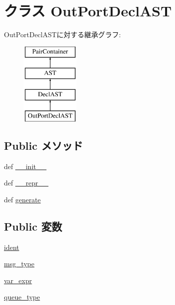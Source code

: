 \hypertarget{classslicc_1_1ast_1_1OutPortDeclAST_1_1OutPortDeclAST}{
\section{クラス OutPortDeclAST}
\label{classslicc_1_1ast_1_1OutPortDeclAST_1_1OutPortDeclAST}
}
OutPortDeclASTに対する継承グラフ:\begin{figure}[H]
\begin{center}
\leavevmode
\includegraphics[height=4cm]{classslicc_1_1ast_1_1OutPortDeclAST_1_1OutPortDeclAST}
\end{center}
\end{figure}
\subsection*{Public メソッド}
\begin{DoxyCompactItemize}
\item 
def \hyperlink{classslicc_1_1ast_1_1OutPortDeclAST_1_1OutPortDeclAST_ac775ee34451fdfa742b318538164070e}{\_\-\_\-init\_\-\_\-}
\item 
def \hyperlink{classslicc_1_1ast_1_1OutPortDeclAST_1_1OutPortDeclAST_ad8b9328939df072e4740cd9a63189744}{\_\-\_\-repr\_\-\_\-}
\item 
def \hyperlink{classslicc_1_1ast_1_1OutPortDeclAST_1_1OutPortDeclAST_a4555d1cee0dccf3942ea35fe86de2e8e}{generate}
\end{DoxyCompactItemize}
\subsection*{Public 変数}
\begin{DoxyCompactItemize}
\item 
\hyperlink{classslicc_1_1ast_1_1OutPortDeclAST_1_1OutPortDeclAST_a2fe57e2d3d2cba9a3aeba2f629eaa78b}{ident}
\item 
\hyperlink{classslicc_1_1ast_1_1OutPortDeclAST_1_1OutPortDeclAST_a35822c953540e9ad193309b6d4f65011}{msg\_\-type}
\item 
\hyperlink{classslicc_1_1ast_1_1OutPortDeclAST_1_1OutPortDeclAST_a97ca97f39ab34737252626affb340d07}{var\_\-expr}
\item 
\hyperlink{classslicc_1_1ast_1_1OutPortDeclAST_1_1OutPortDeclAST_a383182bcdfb28437c9797ab5b6559038}{queue\_\-type}
\end{DoxyCompactItemize}


